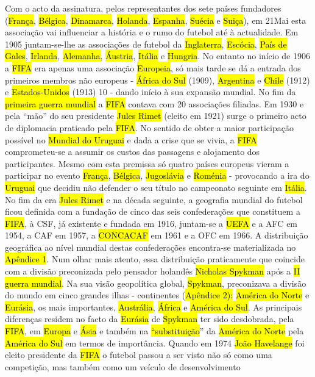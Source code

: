 \documentclass[a4paper,12pt]{article}
\begin{document}
 Com o acto da assinatura, pelos representantes dos sete países fundadores (\hl{França}, \hl{Bélgica}, \hl{Dinamarca}, \hl{Holanda}, \hl{Espanha}, \hl{Suécia} e \hl{Suiça}), em 21Mai esta associação vai influenciar a história e o rumo do futebol até à actualidade. Em 1905 juntam-se-lhe as associações de futebol da \hl{Inglaterra}, \hl{Escócia}, \hl{País de Gales}, \hl{Irlanda}, \hl{Alemanha}, \hl{Áustria}, \hl{Itália} e \hl{Hungria}. No entanto no início de 1906 a \hl{FIFA} era apenas uma associação \hl{Europeia}, só mais tarde se dá a entrada dos primeiros membros não europeus - \hl{África do Sul} (1909), \hl{Argentina} e \hl{Chile} (1912) e \hl{Estados-Unidos} (1913) 10 - dando início à sua expansão mundial. No fim da \hl{primeira guerra mundial} a \hl{FIFA} contava com 20 associações filiadas.
 Em 1930 e pela “mão” do seu presidente \hl{Jules Rimet} (eleito em 1921) surge o primeiro acto de diplomacia praticado pela \hl{FIFA}. No sentido de obter a maior participação possível no \hl{Mundial do Uruguai} e dada a crise que se vivia, a \hl{FIFA} comprometeu-se a assumir os custos das passagens e alojamento dos participantes.
 Mesmo com esta premissa só quatro países europeus vieram a participar no evento \hl{França}, \hl{Bélgica}, \hl{Jugoslávia} e \hl{Roménia} - provocando a ira do \hl{Uruguai} que decidiu não defender o seu título no campeonato seguinte em \hl{Itália}.
 No fim da era \hl{Jules Rimet} e na década seguinte, a geografia mundial do futebol ficou definida com a fundação de cinco das seis confederações que constituem a \hl{FIFA}, à CSF, já existente e fundada em 1916, juntam-se a \hl{UEFA} e a AFC em 1954, a CAF em 1957, a \hl{CONCACAF} em 1961 e a OFC em 1966. A distribuição geográfica ao nível mundial destas confederações encontra-se materializada no \hl{Apêndice 1}. Num olhar mais atento, essa distribuição praticamente que coincide com a divisão preconizada pelo pensador holandês \hl{Nicholas Spykman} após a \hl{II guerra mundial}. Na sua visão geopolítica global, \hl{Spykman}, preconizava a divisão do mundo em cinco grandes ilhas - continentes
(\hl{Apêndice 2):} \hl{América do Norte} e \hl{Eurásia}, os mais importantes, \hl{Austrália}, \hl{África} e \hl{América do Sul}. As principais diferenças residem no facto da \hl{Eurásia} de \hl{Spykman} ter sido desdobrada, pela \hl{FIFA}, em \hl{Europa} e \hl{Ásia} e também na \hl{“substituição}” da \hl{América do Norte} pela \hl{América do Sul} em termos de importância.
 Quando em 1974 \hl{João Havelange} foi eleito presidente da \hl{FIFA} o futebol passou a ser visto não só como uma competição, mas também como um veículo de desenvolvimento
\end{document}
